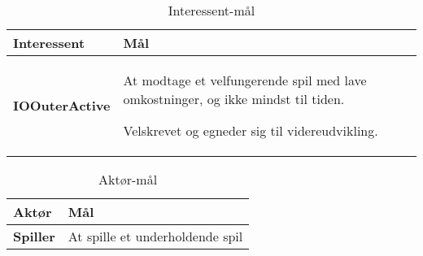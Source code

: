 \documentclass[class=article, crop=false]{standalone}
\makeatletter
\let\savespace\@minipagetrue
\makeatother
\begin{document}
    \begin{table}[H]
        \caption{Interessent-mål\cite{del3}}\label{tab:interessent}
        \begin{tabularx}{\textwidth}{lX}

            \rowcolor[gray]{.8}
            \textbf{Interessent}& \textbf{Mål}   \\ \hline
            \textbf{IOOuterActive}       &


            \savespace \begin{compactitem}
                           \item At modtage et velfungerende spil med lave omkostninger, og ikke mindst til tiden.
                           \item Velskrevet og egneder sig til videreudvikling.
            \end{compactitem}

            \\ \hline


        \end{tabularx}


    \end{table}

    \begin{table}[H]
        \caption{Aktør-mål\cite{del3}}\label{tab:aktoer}
        \begin{tabularx}{\textwidth}{lX}

            \rowcolor[gray]{.8}
            \textbf{Aktør}& \textbf{Mål}   \\ \hline
            \textbf{Spiller}      & At spille et underholdende spil\\ \hline


        \end{tabularx}


    \end{table}
\end{document}
